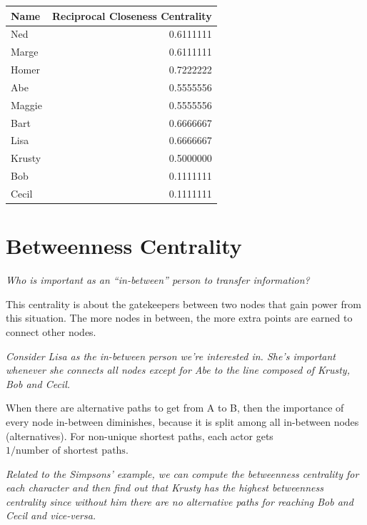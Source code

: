 \documentclass[
  notitlepage,
  onecolumn,
  openany]{book}
\begin{document}
\begin{tabular}{l|r}
\hline
Name & Reciprocal Closeness Centrality\\
\hline
Ned & 0.6111111\\
\hline
Marge & 0.6111111\\
\hline
Homer & 0.7222222\\
\hline
Abe & 0.5555556\\
\hline
Maggie & 0.5555556\\
\hline
Bart & 0.6666667\\
\hline
Lisa & 0.6666667\\
\hline
Krusty & 0.5000000\\
\hline
Bob & 0.1111111\\
\hline
Cecil & 0.1111111\\
\hline
\end{tabular}

\hypertarget{betweenness-centrality}{%
\section{Betweenness Centrality}\label{betweenness-centrality}}

\emph{Who is important as an ``in-between'' person to transfer information?}

This centrality is about the gatekeepers between two nodes that gain power from this situation. The more nodes in between, the more extra points are earned to connect other nodes.

\emph{Consider Lisa as the in-between person we're interested in. She's important whenever she connects all nodes except for Abe to the line composed of Krusty, Bob and Cecil.}

When there are alternative paths to get from A to B, then the importance of every node in-between diminishes, because it is split among all in-between nodes (alternatives). For non-unique shortest paths, each actor gets \(1/\text{number of shortest paths}\).

\emph{Related to the Simpsons' example, we can compute the betweenness centrality for each character and then find out that Krusty has the highest betweenness centrality since without him there are no alternative paths for reaching Bob and Cecil and vice-versa.}
\end{document}
